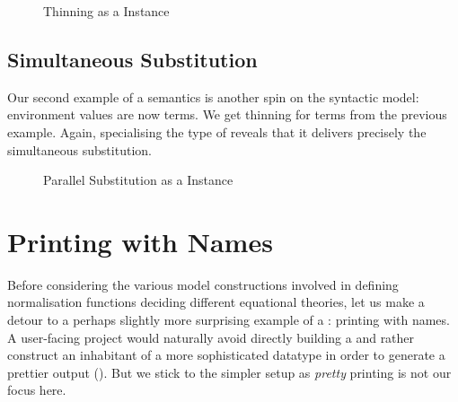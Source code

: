 \begin{figure}[h]
\begin{minipage}{0.5\textwidth}
\end{minipage}\begin{minipage}{0.5\textwidth}
\end{minipage}
\caption{Thinning as a  Instance\label{fig:synren}}
\end{figure}

\subsection{Simultaneous Substitution}

Our second example of a semantics is another spin on the syntactic model:
environment values are now terms. We get thinning for terms from the
previous example. Again, specialising the type of 
reveals that it delivers precisely the simultaneous substitution.

\begin{figure}[h]
\begin{minipage}{0.4\textwidth}
\end{minipage}\begin{minipage}{0.6\textwidth}
\end{minipage}
\caption{Parallel Substitution as a  Instance\label{fig:synsub}}
\end{figure}

\section{Printing with Names}
\label{prettyprint}

Before considering the various model constructions involved in defining
normalisation functions deciding different equational theories, let us
make a detour to a perhaps slightly more surprising example of a
: printing with names. A user-facing project would naturally
avoid directly building a  and rather construct an inhabitant of
a more sophisticated datatype in order to generate a prettier output
(\cite{hughes1995design,wadler2003prettier,Bernardy:2017:PBG:3136534.3110250}).
But we stick to the simpler setup as \emph{pretty} printing is not our focus here.


